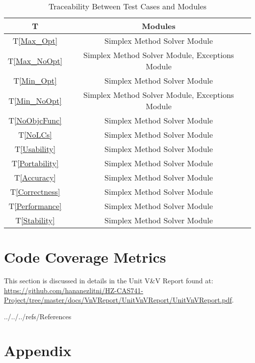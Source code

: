 \documentclass[12pt, titlepage]{article}
\begin{document}
\begin{table} [h!]
	\centering
	\begin{tabular}{|c|c|}
		\hline	
		\textbf{T} & \textbf{Modules}\\
		\hline 
		T\ref{Max_Opt}& Simplex Method Solver Module\\ \hline
		T\ref{Max_NoOpt}& Simplex Method Solver Module, Exceptions Module\\ 
		\hline
		T\ref{Min_Opt}& Simplex Method Solver Module\\ \hline
		T\ref{Min_NoOpt}& Simplex Method Solver Module, Exceptions Module\\ 
		\hline
		T\ref{NoObjcFunc}& Simplex Method Solver Module\\ \hline
		T\ref{NoLCs}& Simplex Method Solver Module\\ \hline
		T\ref{Usability}& Simplex Method Solver Module\\ \hline
		T\ref{Portability}& Simplex Method Solver Module\\ \hline
		T\ref{Accuracy}& Simplex Method Solver Module\\ \hline
		T\ref{Correctness}& Simplex Method Solver Module\\ \hline
		T\ref{Performance}& Simplex Method Solver Module\\ \hline
		T\ref{Stability}& Simplex Method Solver Module\\ \hline
	\end{tabular}
	\caption{Traceability Between Test Cases and Modules}
	\label{Table:Traceability2} 
\end{table}

\newpage

\section{Code Coverage Metrics} \label{CodeCoverage}

This section is discussed in details in the Unit V\&V Report found at: 
\url{https://github.com/hananezlitni/HZ-CAS741-Project/tree/master/docs/VnVReport/UnitVnVReport/UnitVnVReport.pdf}.

\newpage


 {../../../refs/References}

\newpage

\section{Appendix}
\end{document}
